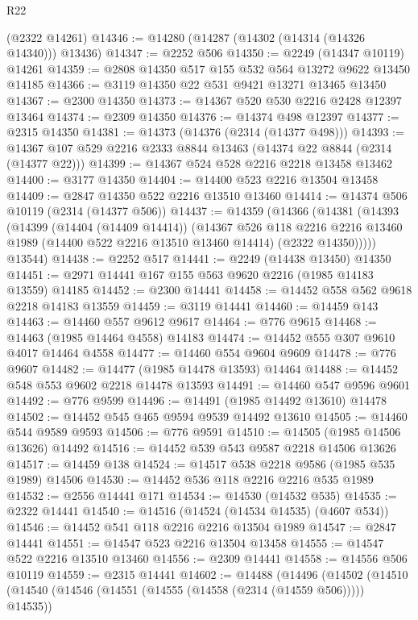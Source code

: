 \begin{lexlean}{R22}
\begin{coremodule}
    (@2322 @14261)
@14346 := @14280 (@14287 (@14302 (@14314 (@14326 @14340))) @13436)
@14347 := @2252 @506
@14350 := @2249 (@14347 @10119) @14261
@14359 := @2808 @14350 @517 @155 @532 @564 @13272 @9622 @13450 @14185
@14366 := @3119 @14350 @22 @531 @9421 @13271 @13465 @13450
@14367 := @2300 @14350
@14373 := @14367 @520 @530 @2216 @2428 @12397 @13464
@14374 := @2309 @14350
@14376 := @14374 @498 @12397
@14377 := @2315 @14350
@14381 := @14373 (@14376 (@2314 (@14377 @498)))
@14393 := @14367 @107 @529 @2216 @2333 @8844 @13463 (@14374 @22 @8844 (@2314 (@14377 @22)))
@14399 := @14367 @524 @528 @2216 @2218 @13458 @13462
@14400 := @3177 @14350
@14404 := @14400 @523 @2216 @13504 @13458
@14409 := @2847 @14350 @522 @2216 @13510 @13460
@14414 := @14374 @506 @10119 (@2314 (@14377 @506))
@14437 := @14359
    (@14366
      (@14381
        (@14393
          (@14399
            (@14404 (@14409 @14414))
            (@14367
              @526
              @118
              @2216
              @2216
              @13460
              @1989
              (@14400 @522 @2216 @13510 @13460 @14414)
              (@2322 @14350)))))
      @13544)
@14438 := @2252 @517
@14441 := @2249 (@14438 @13450) @14350
@14451 := @2971 @14441 @167 @155 @563 @9620 @2216 (@1985 @14183 @13559) @14185
@14452 := @2300 @14441
@14458 := @14452 @558 @562 @9618 @2218 @14183 @13559
@14459 := @3119 @14441
@14460 := @14459 @143
@14463 := @14460 @557 @9612 @9617
@14464 := @776 @9615
@14468 := @14463 (@1985 @14464 @4558) @14183
@14474 := @14452 @555 @307 @9610 @4017 @14464 @4558
@14477 := @14460 @554 @9604 @9609
@14478 := @776 @9607
@14482 := @14477 (@1985 @14478 @13593) @14464
@14488 := @14452 @548 @553 @9602 @2218 @14478 @13593
@14491 := @14460 @547 @9596 @9601
@14492 := @776 @9599
@14496 := @14491 (@1985 @14492 @13610) @14478
@14502 := @14452 @545 @465 @9594 @9539 @14492 @13610
@14505 := @14460 @544 @9589 @9593
@14506 := @776 @9591
@14510 := @14505 (@1985 @14506 @13626) @14492
@14516 := @14452 @539 @543 @9587 @2218 @14506 @13626
@14517 := @14459 @138
@14524 := @14517 @538 @2218 @9586 (@1985 @535 @1989) @14506
@14530 := @14452 @536 @118 @2216 @2216 @535 @1989
@14532 := @2556 @14441 @171
@14534 := @14530 (@14532 @535)
@14535 := @2322 @14441
@14540 := @14516 (@14524 (@14534 @14535) (@4607 @534))
@14546 := @14452 @541 @118 @2216 @2216 @13504 @1989
@14547 := @2847 @14441
@14551 := @14547 @523 @2216 @13504 @13458
@14555 := @14547 @522 @2216 @13510 @13460
@14556 := @2309 @14441
@14558 := @14556 @506 @10119
@14559 := @2315 @14441
@14602 := @14488
    (@14496
      (@14502
        (@14510
          (@14540 (@14546 (@14551 (@14555 (@14558 (@2314 (@14559 @506))))) @14535))

\end{coremodule}
\end{lexlean}
